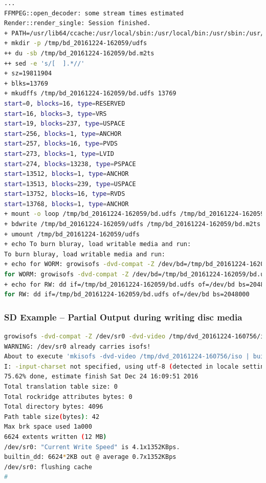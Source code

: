 \begin{lstlisting}[language=bash,numbers=none]
...
FFMPEG::open_decoder: some stream times estimated
Render::render_single: Session finished.
+ PATH=/usr/lib64/ccache:/usr/local/sbin:/usr/local/bin:/usr/sbin:/usr/bin:/root/bin:/mnt0/build5/cinelerra-5.1/bin
+ mkdir -p /tmp/bd_20161224-162059/udfs
++ du -sb /tmp/bd_20161224-162059/bd.m2ts
++ sed -e 's/[  ].*//'
+ sz=19811904
+ blks=13769
+ mkudffs /tmp/bd_20161224-162059/bd.udfs 13769
start=0, blocks=16, type=RESERVED 
start=16, blocks=3, type=VRS 
start=19, blocks=237, type=USPACE 
start=256, blocks=1, type=ANCHOR 
start=257, blocks=16, type=PVDS 
start=273, blocks=1, type=LVID 
start=274, blocks=13238, type=PSPACE 
start=13512, blocks=1, type=ANCHOR 
start=13513, blocks=239, type=USPACE 
start=13752, blocks=16, type=RVDS 
start=13768, blocks=1, type=ANCHOR 
+ mount -o loop /tmp/bd_20161224-162059/bd.udfs /tmp/bd_20161224-162059/udfs
+ bdwrite /tmp/bd_20161224-162059/udfs /tmp/bd_20161224-162059/bd.m2ts
+ umount /tmp/bd_20161224-162059/udfs
+ echo To burn bluray, load writable media and run:
To burn bluray, load writable media and run:
+ echo for WORM: growisofs -dvd-compat -Z /dev/bd=/tmp/bd_20161224-162059/bd.udfs
for WORM: growisofs -dvd-compat -Z /dev/bd=/tmp/bd_20161224-162059/bd.udfs
+ echo for RW: dd if=/tmp/bd_20161224-162059/bd.udfs of=/dev/bd bs=2048000
for RW: dd if=/tmp/bd_20161224-162059/bd.udfs of=/dev/bd bs=2048000
\end{lstlisting}

\subsubsection*{SD Example – Partial Output during writing disc media}
\label{ssub:sd_example_partial_output_writing}

\begin{lstlisting}[language=bash,numbers=none]
growisofs -dvd-compat -Z /dev/sr0 -dvd-video /tmp/dvd_20161224-160756/iso
WARNING: /dev/sr0 already carries isofs!
About to execute 'mkisofs -dvd-video /tmp/dvd_20161224-160756/iso | builtin_dd of=/dev/sr0 obs=32k seek=0'
I: -input-charset not specified, using utf-8 (detected in locale settings)
75.62% done, estimate finish Sat Dec 24 16:09:51 2016
Total translation table size: 0
Total rockridge attributes bytes: 0
Total directory bytes: 4096
Path table size(bytes): 42
Max brk space used 1a000
6624 extents written (12 MB)
/dev/sr0: "Current Write Speed" is 4.1x1352KBps.
builtin_dd: 6624*2KB out @ average 0.7x1352KBps
/dev/sr0: flushing cache
#
\end{lstlisting}

